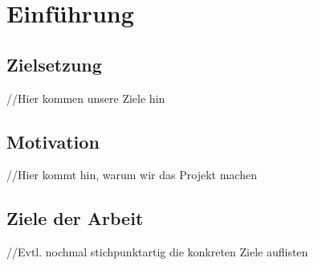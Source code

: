 		\setcounter{page}{1}


\chapter{Einführung}
\section{Zielsetzung}
//Hier kommen unsere Ziele hin

\section{Motivation}
//Hier kommt hin, warum wir das Projekt machen


\section{Ziele der Arbeit}
\label{Ziele}
//Evtl. nochmal stichpunktartig die konkreten Ziele auflisten






